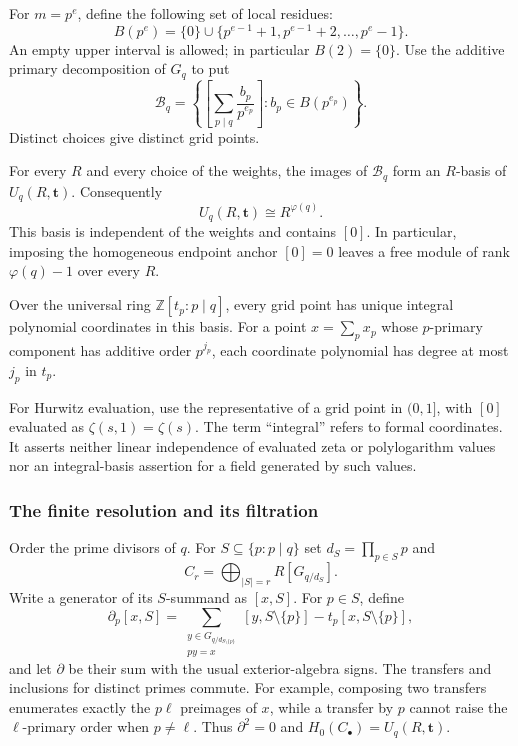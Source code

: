 For $m=p^e$, define the following set of local residues:
\begin{equation}\label{intdist:eq:local-basis}
 B(p^e)=\{0\}\cup\{p^{e-1}+1,p^{e-1}+2,\ldots,p^e-1\}.
\end{equation}
An empty upper interval is allowed; in particular $B(2)=\{0\}$.
Use the additive primary decomposition of $G_q$ to put
\begin{equation}\label{intdist:eq:grid-basis}
 \mathcal B_q=
 \left\{\left[\sum_{p\mid q}\frac{b_p}{p^{e_p}}\right]:
                b_p\in B(p^{e_p})\right\}.
\end{equation}
Distinct choices give distinct grid points.

\begin{theorem}
\label{intdist:thm:basis}
For every $R$ and every choice of the weights, the images of
$\mathcal B_q$ form an $R$-basis of $U_q(R,\mathbf t)$. Consequently
\[
 U_q(R,\mathbf t)\cong R^{\varphi(q)}.
\]
This basis is independent of the weights and contains $[0]$. In
particular, imposing the homogeneous endpoint anchor $[0]=0$ leaves a
free module of rank $\varphi(q)-1$ over every $R$.

Over the universal ring $\mathbb Z[t_p:p\mid q]$, every grid point has
unique integral polynomial coordinates in this basis. For a point
$x=\sum_px_p$ whose $p$-primary component has additive order $p^{j_p}$,
each coordinate polynomial has degree at most $j_p$ in $t_p$.
\end{theorem}

For Hurwitz evaluation, use the representative of a grid point in
$(0,1]$, with $[0]$ evaluated as $\zeta(s,1)=\zeta(s)$.
The term ``integral'' refers to formal coordinates. It asserts neither
linear independence of evaluated zeta or polylogarithm values nor an
integral-basis assertion for a field generated by such values.

\subsubsection{The finite resolution and its filtration}

Order the prime divisors of $q$. For $S\subseteq\{p:p\mid q\}$ set
$d_S=\prod_{p\in S}p$ and
\[
 C_r=\bigoplus_{|S|=r}R[G_{q/d_S}].
\]
Write a generator of its $S$-summand as $[x,S]$. For $p\in S$, define
\[
 \partial_p[x,S]=
 \sum_{\substack{y\in G_{q/d_{S\setminus\{p\}}}\\py=x}}
          [y,S\setminus\{p\}]
 -t_p[x,S\setminus\{p\}],
\]
and let $\partial$ be their sum with the usual exterior-algebra signs.
The transfers and inclusions for distinct primes commute. For example,
composing two transfers enumerates exactly the $p\ell$ preimages of
$x$, while a transfer by $p$ cannot raise the $\ell$-primary order when
$p\ne\ell$. Thus $\partial^2=0$ and
$H_0(C_\bullet)=U_q(R,\mathbf t)$.

